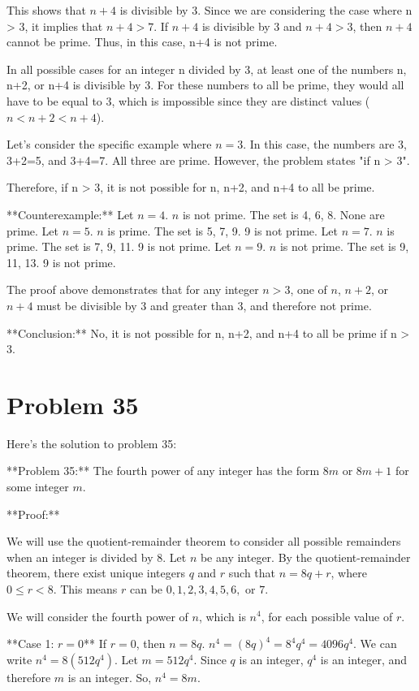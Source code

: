 \documentclass{article}
\begin{document}
This shows that $n + 4$ is divisible by 3.
Since we are considering the case where n > 3, it implies that $n+4 > 7$.
If $n+4$ is divisible by 3 and $n+4 > 3$, then $n+4$ cannot be prime.
Thus, in this case, n+4 is not prime.

In all possible cases for an integer n divided by 3, at least one of the numbers n, n+2, or n+4 is divisible by 3. For these numbers to all be prime, they would all have to be equal to 3, which is impossible since they are distinct values ($n < n+2 < n+4$).

Let's consider the specific example where $n=3$. In this case, the numbers are 3, 3+2=5, and 3+4=7. All three are prime. However, the problem states "if n > 3".

Therefore, if n > 3, it is not possible for n, n+2, and n+4 to all be prime.

**Counterexample:**
Let $n = 4$. $n$ is not prime. The set is 4, 6, 8. None are prime.
Let $n = 5$. $n$ is prime. The set is 5, 7, 9. 9 is not prime.
Let $n = 7$. $n$ is prime. The set is 7, 9, 11. 9 is not prime.
Let $n = 9$. $n$ is not prime. The set is 9, 11, 13. 9 is not prime.

The proof above demonstrates that for any integer $n > 3$, one of $n$, $n+2$, or $n+4$ must be divisible by 3 and greater than 3, and therefore not prime.

**Conclusion:**
No, it is not possible for n, n+2, and n+4 to all be prime if n > 3.

\newpage

\section*{Problem 35}
Here's the solution to problem 35:

**Problem 35:** The fourth power of any integer has the form $8m$ or $8m + 1$ for some integer $m$.

**Proof:**

We will use the quotient-remainder theorem to consider all possible remainders when an integer is divided by 8.
Let $n$ be any integer. By the quotient-remainder theorem, there exist unique integers $q$ and $r$ such that $n = 8q + r$, where $0 \le r < 8$.
This means $r$ can be $0, 1, 2, 3, 4, 5, 6,$ or $7$.

We will consider the fourth power of $n$, which is $n^4$, for each possible value of $r$.

**Case 1: $r = 0$**
If $r = 0$, then $n = 8q$.
$n^4 = (8q)^4 = 8^4 q^4 = 4096 q^4$.
We can write $n^4 = 8(512 q^4)$. Let $m = 512 q^4$. Since $q$ is an integer, $q^4$ is an integer, and therefore $m$ is an integer.
So, $n^4 = 8m$.
\end{document}
